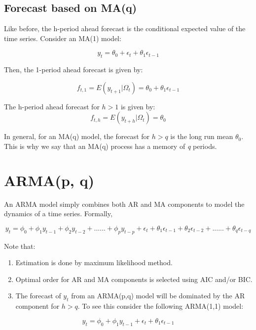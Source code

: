 \documentclass[]{book}
\theoremstyle{definition}
\theoremstyle{definition}
\theoremstyle{definition}
\theoremstyle{remark}
\begin{document}
\hypertarget{forecast-based-on-maq}{%
\subsection{Forecast based on MA(q)}\label{forecast-based-on-maq}}

Like before, the h-period ahead forecast is the conditional expected value of the time series. Consider an MA(1) model:

\[y_t=\theta_0 +\epsilon_t + \theta_1 \epsilon_{t-1}\]

Then, the 1-period ahead forecast is given by:

\[f_{t,1}=E(y_{t+1}|\Omega_t)=\theta_0+ \theta_1 \epsilon_{t-1}\]

The h-period ahead forecast for \(h>1\) is given by:
\[f_{t,h}=E(y_{t+h}|\Omega_t)=\theta_0\]

In general, for an MA(q) model, the forecast for \(h>q\) is the long run mean \(\theta_0\). This is why we say that an MA(q) process has a memory of \emph{q} periods.

\hypertarget{armap-q}{%
\section{ARMA(p, q)}\label{armap-q}}

An ARMA model simply combines both AR and MA components to model the dynamics of a time series. Formally,

\begin{equation}
   y_t = \phi_0 +\phi_1 y_{t-1} + \phi_2 y_{t-2} + ...... + \phi_p y_{t-p}+\epsilon_t + \theta_1 \epsilon_{t-1} + \theta_2 \epsilon_{t-2} + ...... + \theta_q \epsilon_{t-q}
   \end{equation}

Note that:

\begin{enumerate}
\def\labelenumi{\arabic{enumi}.}
\item
  Estimation is done by maximum likelihood method.
\item
  Optimal order for AR and MA components is selected using AIC and/or BIC.
\item
  The forecast of \(y_t\) from an ARMA(p,q) model will be dominated by the AR component for \(h>q\). To see this consider the following ARMA(1,1) model:
\end{enumerate}

\[y_t = \phi_0 +\phi_1 y_{t-1}+ \epsilon_t + \theta_1 \epsilon_{t-1}\]
\end{document}
